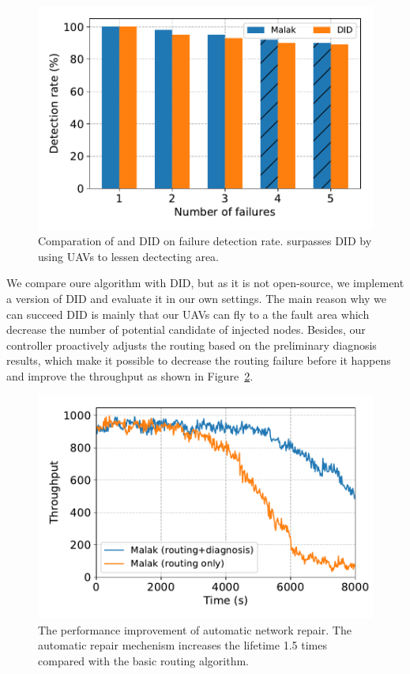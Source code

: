 \begin{figure}[htbp]
	\centering
	\includegraphics[width=.95\columnwidth]{Figure/did_comp}
	\vspace{-0.1in}
	\caption{Comparation of {\sdn} and DID on failure detection rate.
		\textnormal{
			{\sdn} surpasses DID by using UAVs to lessen dectecting area.
		}}
	\label{fig:did_comp}
\end{figure}

We compare oure algorithm with DID\cite{Gong2015}, but as it is
not open-source, we implement a version of DID and evaluate it in our own
settings. The main reason why we can succeed DID is mainly that our UAVs can fly
to a the fault area which decrease the number of potential candidate of injected
nodes. Besides, our controller proactively adjusts the routing based on the
preliminary diagnosis results, which make it possible to decrease the routing
failure before it happens and improve the throughput as shown in
Figure~\ref{fig:diagnosis}.

\begin{figure}[htbp]
	\centering
	\includegraphics[width=.95\columnwidth]{Figure/diagnosis}
	\vspace{-0.1in}
	\caption{The performance improvement of automatic network repair.
		\textnormal{
			The automatic repair mechenism increases the lifetime 1.5 times
			compared with the basic {\sdn} routing algorithm.
		}}
	\label{fig:diagnosis}
\end{figure}

